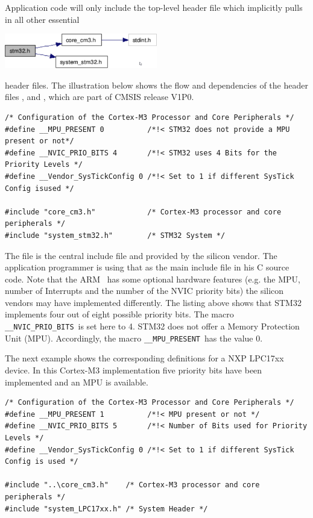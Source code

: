Application code will only include the top-level header file which implicitly
pulls in all other essential

\bigskip
\includegraphics[width=0.5\textwidth]{duolos_CMSIS/stm32.png}
\bigskip

header files. The illustration below shows the flow and dependencies of the
header files ,  and ,
which are part of CMSIS release V1P0.

\begin{lstlisting}[style=cpp]
/* Configuration of the Cortex-M3 Processor and Core Peripherals */
#define __MPU_PRESENT 0			 /*!< STM32 does not provide a MPU present or not*/
#define __NVIC_PRIO_BITS 4		 /*!< STM32 uses 4 Bits for the Priority Levels */
#define __Vendor_SysTickConfig 0 /*!< Set to 1 if different SysTick Config isused */
 
#include "core_cm3.h" 	 		 /* Cortex-M3 processor and core peripherals */ 
#include "system_stm32.h" 		 /* STM32 System */
\end{lstlisting}

The  file is the central include file and provided by the
silicon vendor. The application programmer is using that as the main include file in his
C source code. Note that the ARM \ has some optional hardware features
(e.g. the MPU, number of Interrupts and the number of the NVIC priority bits)
the silicon vendors may have implemented differently. The listing above shows
that STM32 implements four out of eight possible priority bits. The macro
\verb"__NVIC_PRIO_BITS"\ is set here to 4. STM32 does not offer a Memory
Protection Unit (MPU). Accordingly, the macro \verb"__MPU_PRESENT"\ has the
value 0.

The next example shows the corresponding definitions for a NXP LPC17xx device.
In this Cortex-M3 implementation five priority bits have been implemented and an
MPU is available.

\begin{lstlisting}[style=cpp]
/* Configuration of the Cortex-M3 Processor and Core Peripherals */
#define __MPU_PRESENT 1 		 /*!< MPU present or not */
#define __NVIC_PRIO_BITS 5 		 /*!< Number of Bits used for Priority Levels */
#define __Vendor_SysTickConfig 0 /*!< Set to 1 if different SysTick Config is used */

#include "..\core_cm3.h" 	/* Cortex-M3 processor and core peripherals */
#include "system_LPC17xx.h" /* System Header */
\end{lstlisting}

